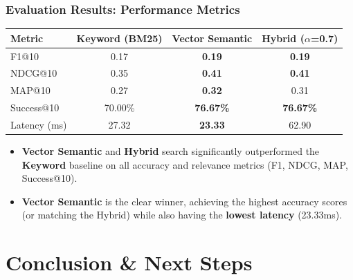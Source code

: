 \documentclass{beamer}
\begin{document}
\begin{frame}
  \frametitle{Evaluation Results: Performance Metrics}
  
  \begin{table}[h]
    \centering
    \small
    \begin{tabular}{lccc}
      \toprule
      \textbf{Metric} & \textbf{Keyword (BM25)} & \textbf{Vector Semantic} & \textbf{Hybrid ($\alpha$=0.7)} \\
      \midrule
      F1@10           & 0.17 & \textbf{0.19} & \textbf{0.19} \\
      NDCG@10         & 0.35 & \textbf{0.41} & \textbf{0.41} \\
      MAP@10          & 0.27 & \textbf{0.32} & 0.31 \\
      Success@10      & 70.00\% & \textbf{76.67\%} & \textbf{76.67\%} \\
      Latency (ms)    & 27.32 & \textbf{23.33} & 62.90 \\
      \bottomrule
    \end{tabular}
  \end{table}

  \vspace{0.5cm} %

  \begin{itemize}
    \item \textbf{Vector Semantic} and \textbf{Hybrid} search significantly outperformed the \textbf{Keyword} baseline on all accuracy and relevance metrics (F1, NDCG, MAP, Success@10).
    \item \textbf{Vector Semantic} is the clear winner, achieving the highest accuracy scores (or matching the Hybrid) while also having the \textbf{lowest latency} (23.33ms).
 
  \end{itemize}

\end{frame}




\section{Conclusion \& Next Steps}
\end{document}
